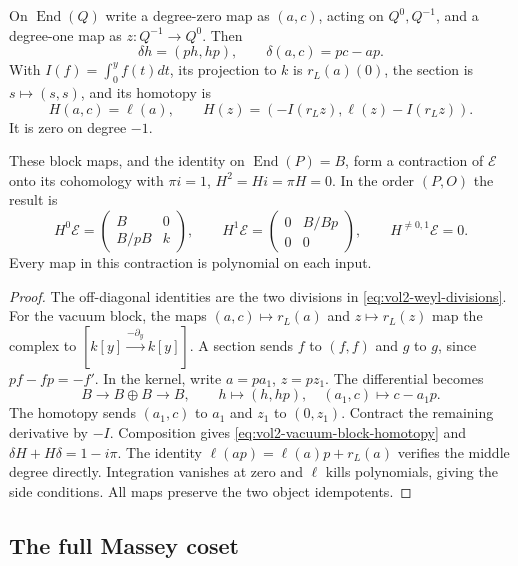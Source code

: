 On $\operatorname{End}(Q)$ write a degree-zero map as $(a,c)$,
acting on $Q^0,Q^{-1}$, and a degree-one map as $z:Q^{-1}\to Q^0$.
Then
\begin{equation}\label{eq:vol2-vacuum-block}
 \delta h=(ph,hp),\qquad \delta(a,c)=pc-ap.
\end{equation}
With $I(f)=\int_0^yf(t)dt$, its projection to $k$ is
$r_L(a)(0)$, the section is $s\mapsto(s,s)$, and its homotopy is
\begin{equation}\label{eq:vol2-vacuum-block-homotopy}
 H(a,c)=\ell(a),\qquad
 H(z)=(-I(r_Lz),\ell(z)-I(r_Lz)).
\end{equation}
It is zero on degree $-1$.

\begin{proposition}\label{prop:vol2-marked-contraction}
These block maps, and the identity on $\operatorname{End}(P)=B$,
form a contraction of $\mathscr E$ onto its cohomology with
$\pi i=1$, $H^2=Hi=\pi H=0$. In the order $(P,O)$ the result is
\[
 H^0\mathscr E=\begin{pmatrix}B&0\\B/pB&k\end{pmatrix},
 \qquad
 H^1\mathscr E=\begin{pmatrix}0&B/Bp\\0&0\end{pmatrix},
 \qquad H^{\ne0,1}\mathscr E=0.
\]
Every map in this contraction is polynomial on each input.
\end{proposition}
\begin{proof}
The off-diagonal identities are the two divisions in
\eqref{eq:vol2-weyl-divisions}. For the vacuum block, the maps
$(a,c)\mapsto r_L(a)$ and $z\mapsto r_L(z)$ map the complex to
$[k[y]\xrightarrow{-\partial_y}k[y]]$.
A section sends $f$ to $(f,f)$ and $g$ to $g$, since
$pf-fp=-f'$. In the kernel, write $a=pa_1$, $z=pz_1$.
The differential becomes
\[
 B\longrightarrow B\oplus B\longrightarrow B,
 \qquad h\longmapsto(h,hp),\quad(a_1,c)\longmapsto c-a_1p.
\]
The homotopy sends $(a_1,c)$ to $a_1$ and $z_1$ to $(0,z_1)$.
Contract the remaining derivative by $-I$. Composition gives
\eqref{eq:vol2-vacuum-block-homotopy} and
$\delta H+H\delta=1-i\pi$. The identity
$\ell(ap)=\ell(a)p+r_L(a)$ verifies the middle degree directly.
Integration vanishes at zero and $\ell$ kills polynomials, giving
the side conditions. All maps preserve the two object idempotents.
\end{proof}

\subsection{The full Massey coset}

